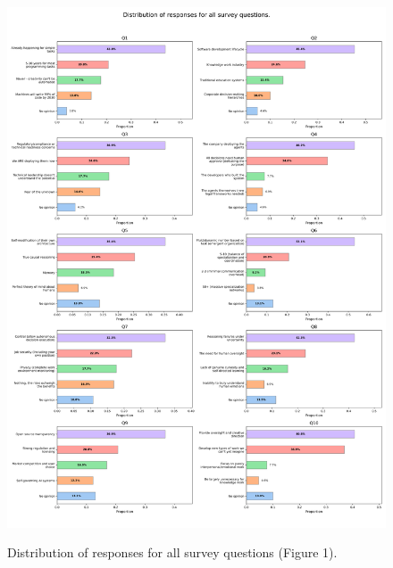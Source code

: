 \documentclass{article}
\begin{document}
\begin{figure}[htbp]

	{\includegraphics[width=\textwidth, height=0.8\textheight, keepaspectratio]{figs/all_questions_grid_improved.png}}

	\caption{Distribution of responses for all survey questions (Figure 1).}\label{fig:all_questions_grid}

\end{figure}%
\end{document}
